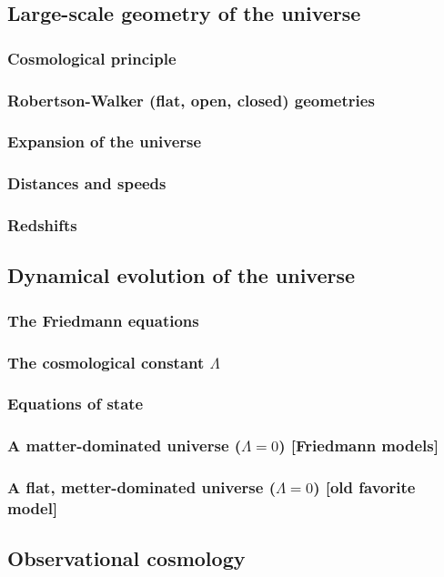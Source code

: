 \documentclass{article}
\theoremstyle{definition}
\begin{document}
\subsection{Large-scale geometry of the universe}
\subsubsection{Cosmological principle}
\subsubsection{Robertson-Walker (flat, open, closed) geometries}
\subsubsection{Expansion of the universe}
\subsubsection{Distances and speeds}
\subsubsection{Redshifts}
\subsection{Dynamical evolution of the universe}
\subsubsection{The Friedmann equations}
\subsubsection{The cosmological constant $\Lambda$}
\subsubsection{Equations of state}
\subsubsection{A matter-dominated universe ($\Lambda = 0$) [Friedmann models]}
\subsubsection{A flat, metter-dominated universe ($\Lambda = 0$) [old favorite model]}
\subsection{Observational cosmology}
\end{document}
